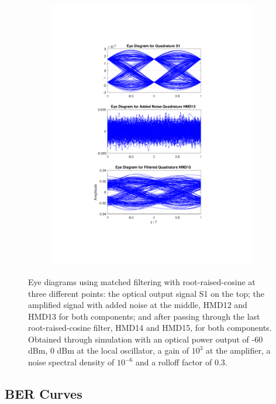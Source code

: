 \begin{figure}[H]
\begin{subfigure}{.45\textwidth}
		\includegraphics[clip, trim=5cm 4cm 5cm 4cm, width=\textwidth]{./sdf/m_qam_system/figures/eyes/q_n_p_60_03_rc.pdf}
	\end{subfigure}
	
	\caption{Eye diagrams using matched filtering with root-raised-cosine at three different points: the optical output signal S1 on the top; the amplified signal with added noise at the middle, HMD12 and HMD13 for both components; and after passing through the last root-raised-cosine filter, HMD14 and HMD15, for both components. Obtained through simulation with an optical power output of -60 dBm, 0 dBm at the local oscillator, a gain of $10^3$ at the amplifier, a noise spectral density of $10^{-6}$ and a rolloff factor of 0.3.\label{fig:eyes_n_rc_60_03}}
	
\end{figure}



\subsection{BER Curves}

